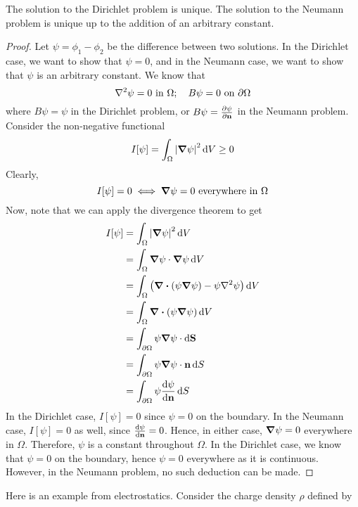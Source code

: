 \begin{proposition}
	The solution to the Dirichlet problem is unique. The solution to the Neumann problem is unique up to the addition of an arbitrary constant.
\end{proposition}
\begin{proof}
	Let $\psi = \phi_1 - \phi_2$ be the difference between two solutions. In the Dirichlet case, we want to show that $\psi = 0$, and in the Neumann case, we want to show that $\psi$ is an arbitrary constant. We know that
	\[ \laplacian{\psi} = 0 \text{ in } \Omega;\quad B\psi = 0 \text{ on } \partial\Omega \]
	where $B\psi = \psi$ in the Dirichlet problem, or $B\psi = \pdv{\psi}{\vb n}$ in the Neumann problem. Consider the non-negative functional
	\[ I[\psi] = \int_\Omega \abs{\grad{\psi}}^2 \dd{V} \geq 0 \]
	Clearly,
	\[ I[\psi] = 0 \iff \grad{\psi} = 0 \text{ everywhere in } \Omega \]
	Now, note that we can apply the divergence theorem to get
	\begin{align*}
		I[\psi] & = \int_\Omega \abs{\grad{\psi}}^2 \dd{V}                                          \\
		        & = \int_\Omega \grad{\psi} \cdot \grad{\psi} \dd{V}                                \\
		        & = \int_\Omega \left( \div(\psi \grad{\psi}) - \psi\laplacian{\psi} \right) \dd{V} \\
		        & = \int_\Omega \div(\psi \grad{\psi}) \dd{V}                                       \\
		        & = \int_{\partial\Omega} \psi \grad{\psi} \cdot\dd{\vb S}                          \\
		        & = \int_{\partial\Omega} \psi \grad{\psi} \cdot \vb n \dd{S}                       \\
		        & = \int_{\partial\Omega} \psi \dv{\psi}{\vb n} \dd{S}                              \\
	\end{align*}
	In the Dirichlet case, $I[\psi] = 0$ since $\psi = 0$ on the boundary. In the Neumann case, $I[\psi] = 0$ as well, since $\dv{\psi}{\vb n} = 0$. Hence, in either case, $\grad{\psi} = 0$ everywhere in $\Omega$. Therefore, $\psi$ is a constant throughout $\Omega$. In the Dirichlet case, we know that $\psi = 0$ on the boundary, hence $\psi = 0$ everywhere as it is continuous. However, in the Neumann problem, no such deduction can be made.
\end{proof}
\noindent Here is an example from electrostatics. Consider the charge density $\rho$ defined by
